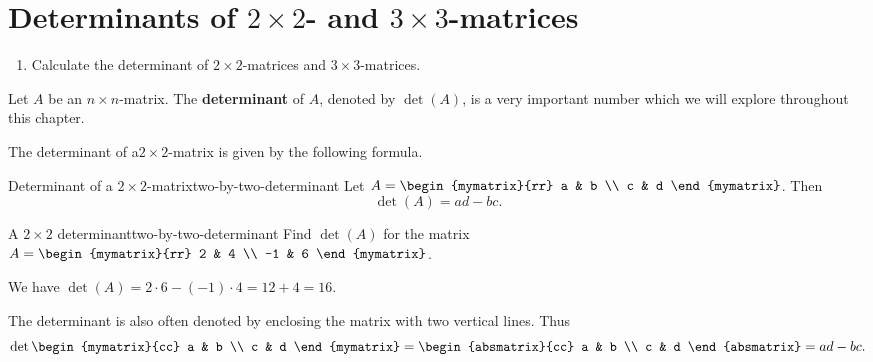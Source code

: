 \section{Determinants of \texorpdfstring{$2\times 2$}{2x2}- and \texorpdfstring{$3\times 3$}{3x3}-matrices}

\begin{outcome}
  \begin{enumerate}
    \item Calculate the determinant of $2\times 2$-matrices and
      $3\times 3$-matrices.
  \end{enumerate}
\end{outcome}

Let $A$ be an $n\times n$-matrix. The \textbf{determinant}%
 of $A$, denoted by $\det(A)$, is a very important
number which we will explore throughout this chapter.

The determinant of a$2\times 2$-matrix is given by the following
formula.

\begin{definition}{Determinant of a $2\times 2$-matrix}{two-by-two-determinant}
  Let $A=\begin{mymatrix}{rr}
    a & b \\
    c & d
  \end{mymatrix}$. Then
  \begin{equation*}
    \det(A) = ad-bc.
  \end{equation*}
\end{definition}

\begin{example}{A $2\times 2$ determinant}{two-by-two-determinant}
  Find $\det(A)$ for the matrix
  $A =  \begin{mymatrix}{rr}
    2 & 4 \\
    -1 & 6
  \end{mymatrix}$.
\end{example}

\begin{solution}
  We have $\det(A) = 2\cdot 6 - (-1)\cdot 4 = 12 + 4 = 16$.
\end{solution}

The determinant is also often denoted by enclosing the matrix with two
vertical lines. Thus
\begin{equation*}
  \det \begin{mymatrix}{cc}
    a & b \\
    c & d
  \end{mymatrix} =\begin{absmatrix}{cc}
    a & b \\
    c & d
  \end{absmatrix}
  = ad - bc.
\end{equation*}

